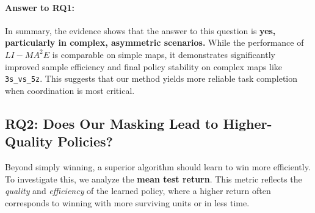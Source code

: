 \paragraph{Answer to RQ1:}
In summary, the evidence shows that the answer to this question is \textbf{yes, particularly in complex, asymmetric scenarios.} While the performance of $LI-{MA}^2E$ is comparable on simple maps, it demonstrates significantly improved sample efficiency and final policy stability on complex maps like \texttt{3s\_vs\_5z}. This suggests that our method yields more reliable task completion when coordination is most critical.

\subsection{RQ2: Does Our Masking Lead to Higher-Quality Policies?}

Beyond simply winning, a superior algorithm should learn to win more efficiently. To investigate this, we analyze the \textbf{mean test return}. This metric reflects the \textit{quality} and \textit{efficiency} of the learned policy, where a higher return often corresponds to winning with more surviving units or in less time.


